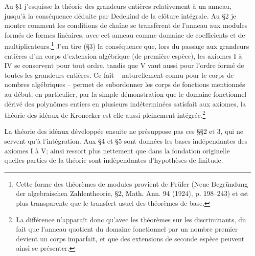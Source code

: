 Au \S{}1 j'esquisse la théorie des grandeurs entières relativement à un anneau, jusqu'à la conséquence déduite par Dedekind de la clôture intégrale. Au \S{}2 je montre comment les conditions de chaîne se transfèrent de l'anneau aux modules formés de formes linéaires, avec cet anneau comme domaine de coefficients et de multiplicateurs.\footnote{Cette forme des théorèmes de modules provient de Prüfer (Neue Begründung der algebraischen Zahlentheorie, \S{}2, Math. Ann. 94 (1924), p. 198--243) et est plus transparente que le transfert usuel des théorèmes de base.} J'en tire (\S{}3) la conséquence que, lors du passage aux grandeurs entières d'un corps d'extension algébrique (de première espèce), les axiomes I à IV se conservent pour tout ordre, tandis que V vaut aussi pour l'ordre formé de toutes les grandeurs entières. Ce fait -- naturellement connu pour le corps de nombres algébriques -- permet de subordonner les corps de fonctions mentionnés au début; en particulier, par la simple démonstration que le domaine fonctionnel dérivé des polynômes entiers en plusieurs indéterminées satisfait aux axiomes, la théorie des idéaux de Kronecker est elle aussi pleinement intégrée.\footnote{La différence n'apparaît donc qu'avec les théorèmes sur les discriminants, du fait que l'anneau quotient du domaine fonctionnel par un nombre premier devient un corps imparfait, et que des extensions de seconde espèce peuvent ainsi se présenter.}

La théorie des idéaux développée ensuite ne présuppose pas ces \S{}\S{}2 et 3, qui ne servent qu'à l'intégration. Aux \S{}4 et \S{}5 sont données les bases indépendantes des axiomes I à V; ainsi ressort plus nettement que dans la fondation originelle quelles parties de la théorie sont indépendantes d'hypothèses de finitude.
